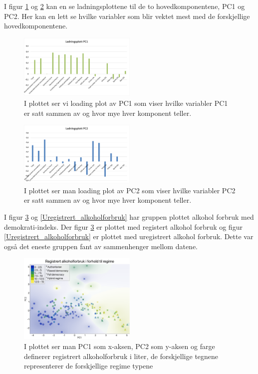 \documentclass[twocolumn, 11pt]{article} %
\begin{document}
I figur \ref{loading_pc1} og \ref{loading_pc2} kan en se ladningsplottene til de to hovedkomponentene, PC1 og PC2. Her kan en lett se hvilke variabler som blir vektet mest med de forskjellige hovedkomponentene.

\begin{figure}[H]
\includegraphics[width=0.5\textwidth]{images/Ladningsplott_pc1.png}
\caption{I plottet ser vi loading plot av PC1 som viser hvilke variabler PC1 er satt sammen av og hvor mye hver komponent teller.}
\label{loading_pc1}
\end{figure}

\begin{figure}[H]
\includegraphics[width=0.5\textwidth]{images/ladningsplott_pc2.png}
\caption{I plottet ser man loading plot av PC2 som viser hvilke variabler PC2 er satt sammen av og hvor mye hver komponent teller.}
\label{loading_pc2}
\end{figure}


I figur \ref{Registrert_alkoholforbruk} og \ref{Uregistrert_alkoholforbruk} har gruppen plottet alkohol forbruk med demokrati-indeks. Der figur \ref{Registrert_alkoholforbruk} er plottet med registert alkohol forbruk og figur \ref{Uregistrert_alkoholforbruk} er plottet med uregistrert alkohol forbruk. Dette var også det eneste gruppen fant av sammenhenger mellom datene.

\begin{figure}[H]
\includegraphics[width=0.5\textwidth]{images/Registrert_alkoholforbruk.png}
\caption{I plottet ser man PC1 som x-aksen, PC2 som y-aksen og farge definerer registrert alkoholforbruk i liter, de forskjellige tegnene representerer de forskjellige regime typene}
\label{Registrert_alkoholforbruk}
\end{figure}
\end{document}
